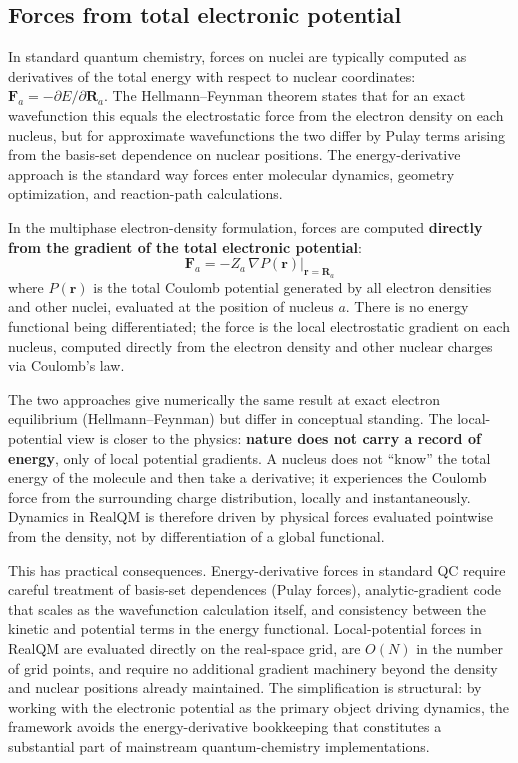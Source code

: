 \documentclass[11pt]{article}
\begin{document}
\subsection{Forces from total electronic potential}\label{sec:forces}

In standard quantum chemistry, forces on nuclei are typically computed as derivatives of the total energy with respect to nuclear coordinates: $\mathbf{F}_a = -\partial E / \partial \mathbf{R}_a$. The Hellmann--Feynman theorem states that for an exact wavefunction this equals the electrostatic force from the electron density on each nucleus, but for approximate wavefunctions the two differ by Pulay terms arising from the basis-set dependence on nuclear positions. The energy-derivative approach is the standard way forces enter molecular dynamics, geometry optimization, and reaction-path calculations.

In the multiphase electron-density formulation, forces are computed \textbf{directly from the gradient of the total electronic potential}:
\begin{equation}
\mathbf{F}_a = -Z_a \, \nabla P(\mathbf{r}) \big|_{\mathbf{r} = \mathbf{R}_a}
\end{equation}
where $P(\mathbf{r})$ is the total Coulomb potential generated by all electron densities and other nuclei, evaluated at the position of nucleus $a$. There is no energy functional being differentiated; the force is the local electrostatic gradient on each nucleus, computed directly from the electron density and other nuclear charges via Coulomb's law.

The two approaches give numerically the same result at exact electron equilibrium (Hellmann--Feynman) but differ in conceptual standing. The local-potential view is closer to the physics: \textbf{nature does not carry a record of energy}, only of local potential gradients. A nucleus does not ``know'' the total energy of the molecule and then take a derivative; it experiences the Coulomb force from the surrounding charge distribution, locally and instantaneously. Dynamics in RealQM is therefore driven by physical forces evaluated pointwise from the density, not by differentiation of a global functional.

This has practical consequences. Energy-derivative forces in standard QC require careful treatment of basis-set dependences (Pulay forces), analytic-gradient code that scales as the wavefunction calculation itself, and consistency between the kinetic and potential terms in the energy functional. Local-potential forces in RealQM are evaluated directly on the real-space grid, are $O(N)$ in the number of grid points, and require no additional gradient machinery beyond the density and nuclear positions already maintained. The simplification is structural: by working with the electronic potential as the primary object driving dynamics, the framework avoids the energy-derivative bookkeeping that constitutes a substantial part of mainstream quantum-chemistry implementations.
\end{document}
